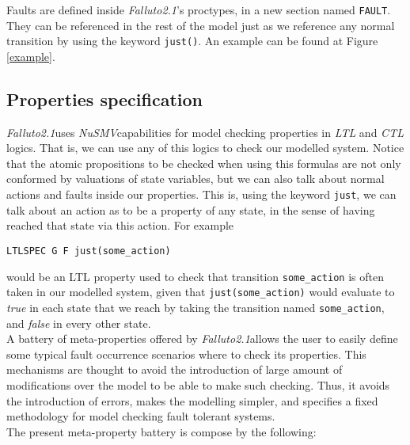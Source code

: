 \documentclass[12pt]{article}
\newcommand{\nusmv}{\mbox{\textit{NuSMV}}}
\newcommand{\falluto}{\mbox{\textit{Falluto2.1}}}
\begin{document}
Faults are defined inside \falluto's proctypes, in a new section named \texttt{FAULT}. They can be referenced in the rest of the model just as we reference any normal transition by using the keyword \texttt{just()}. An example can be found at Figure \ref{example}.

\subsection{Properties specification}
\falluto uses \nusmv capabilities for model checking properties in \textit{LTL} and \textit{CTL} logics. That is, we can use any of this logics to check our modelled system. Notice that the atomic propositions to be checked when using this formulas are not only conformed by valuations of state variables, but we can also talk about normal actions and faults inside our properties. This is, using the keyword \texttt{just}, we can talk about an action as to be a property of any state, in the sense of having reached that state via this action. For example
\begin{center}
\texttt{LTLSPEC G F just(some\_action)}
\end{center}
would be an LTL property used to check that transition \texttt{some\_action} is often taken in our modelled system, given that \texttt{just(some\_action)} would evaluate to \textit{true} in each state that we reach by taking the transition named \texttt{some\_action}, and \textit{false} in every other state.\\
A battery of meta-properties offered by \falluto allows the user to easily define some typical fault occurrence scenarios where to check its properties. This mechanisms are thought to avoid the introduction of large amount of modifications over the model to be able to make such checking. Thus, it avoids the introduction of errors, makes the modelling simpler, and specifies a fixed methodology for model checking fault tolerant systems.\\
The present meta-property battery is compose by the following:
\end{document}
